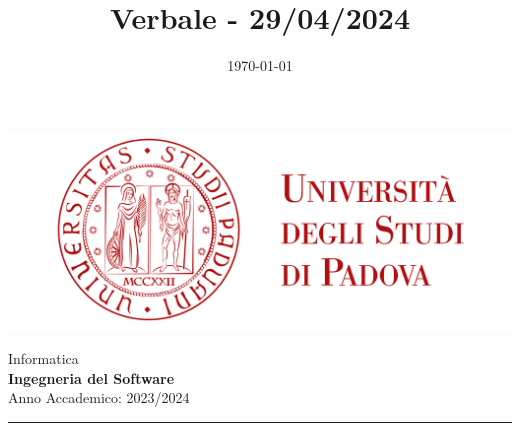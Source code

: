 \documentclass[5pt]{article}
\title{ Verbale - 29/04/2024 }
\date{\today}
\begin{document}


    \vspace{8pt}
    \includegraphics[scale=0.2]{UNIPDFull.png}

\vspace{10pt}

\begin{minipage}[t]{0.48\textwidth}
        \begin{flushleft}
            Informatica\\
            \vspace{5pt}
            \textbf{\LARGE Ingegneria del Software}\\
            Anno Accademico: 2023/2024
        \end{flushleft}
\end{minipage}


\vspace{5px}


\rule{\textwidth}{5pt}
\end{document}
